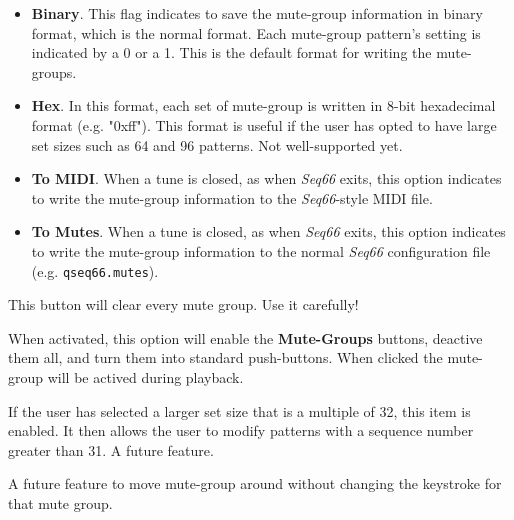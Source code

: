       \begin{itemize}
         \item \textbf{Binary}.
            This flag indicates to save the mute-group information in
            binary format, which is the normal format.
            Each mute-group pattern's setting is indicated by a 0 or a 1.
            This is the default format for writing the mute-groups.
         \item \textbf{Hex}.
            In this format, each set of mute-group is written in 8-bit hexadecimal
            format (e.g. "0xff").  This format is useful if the user has opted to
            have large set sizes such as 64 and 96 patterns.  Not well-supported
            yet.
         \item \textbf{To MIDI}.
            When a tune is closed, as when \textsl{Seq66} exits, this option
            indicates to write the mute-group information to the
            \textsl{Seq66}-style MIDI file.
         \item \textbf{To Mutes}.
            When a tune is closed, as when \textsl{Seq66} exits, this option
            indicates to write the mute-group information to the normal
            \textsl{Seq66} configuration file (e.g. \texttt{qseq66.mutes}).
      \end{itemize}

      This button will clear every mute group. Use it carefully!

      When activated, this option will enable the \textbf{Mute-Groups} buttons,
      deactive them all, and turn them into standard push-buttons.  When clicked
      the mute-group will be actived during playback.

      If the user has selected a larger set size that is a multiple of 32, this
      item is enabled.  It then allows the user to modify patterns with a
      sequence number greater than 31.  A future feature.

      A future feature to move mute-group around without
      changing the keystroke for that mute group.

